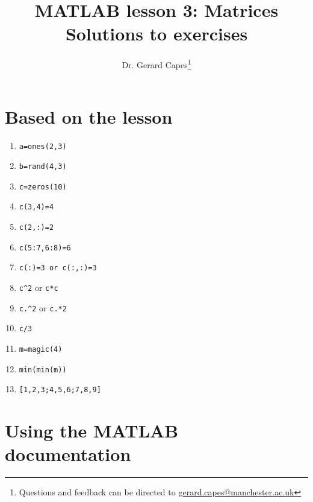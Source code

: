 \documentclass[a4paper]{article}
\title{MATLAB lesson 3: Matrices\\Solutions to exercises}
\date{}
\author{Dr. Gerard Capes\thanks{Questions and feedback can be directed to \href{mailto:gerard.capes@manchester.ac.uk?subject=Feedback on MATLAB lesson 3 (matrices) solution sheet}{gerard.capes@manchester.ac.uk}}}
\begin{document}
\maketitle

\section{Based on the lesson}

\begin{enumerate}
	\item \lstinline[style=Matlab-editor]!a=ones(2,3)!
	\item \lstinline[style=Matlab-editor]!b=rand(4,3)!
	\item \lstinline[style=Matlab-editor]!c=zeros(10)!
	\item \lstinline[style=Matlab-editor]!c(3,4)=4!
	\item \lstinline[style=Matlab-editor]!c(2,:)=2!
	\item \lstinline[style=Matlab-editor]!c(5:7,6:8)=6!
	\item \lstinline[style=Matlab-editor]!c(:)=3 or c(:,:)=3!
	\item \lstinline[style=Matlab-editor]!c^2! or \lstinline[style=Matlab-editor]!c*c!
	\item \lstinline[style=Matlab-editor]!c.^2! or \lstinline[style=Matlab-editor]!c.*2!
	\item \lstinline[style=Matlab-editor]!c/3!
	\item \lstinline[style=Matlab-editor]!m=magic(4)!
	\item \lstinline[style=Matlab-editor]!min(min(m))!
	\item \lstinline[style=Matlab-editor]![1,2,3;4,5,6;7,8,9]!
\end{enumerate}

\medskip

\section{Using the MATLAB documentation}
\end{document}
